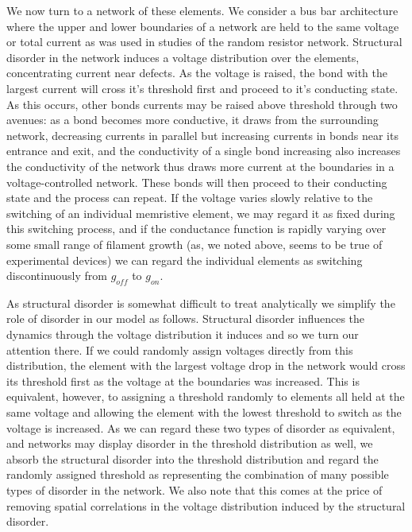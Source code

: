 \documentclass[aps,prl,reprint,groupedaddress]{revtex4-1}
\begin{document}
We now turn to a network of these elements.  We consider a bus bar
architecture
where the upper and lower boundaries of a network are held to the same
voltage or total current as was used in studies of the random resistor network.
Structural disorder in the
network induces a voltage distribution over the elements, concentrating
current near defects. As the voltage is raised, the bond with the largest
current will cross it's threshold first and proceed to it's conducting state.
As this occurs, other bonds currents may be raised above threshold through
two avenues: as a bond becomes more conductive, it draws from the surrounding
network, decreasing currents in parallel but increasing currents in bonds near
its entrance and exit, and the conductivity of a single bond increasing also
increases the conductivity of the network thus draws more current at the
boundaries in a voltage-controlled network. These bonds will then proceed to
their conducting state and the process can repeat.  If the voltage varies
slowly relative to the switching of an individual memristive element, we may
regard it as fixed during this switching process, and if the conductance
function is rapidly varying over some small range of filament growth (as,
we noted above, seems to be true of experimental devices) we can regard the
individual elements as switching discontinuously from
$g_{off}$ to $g_{on}$.

As structural disorder is somewhat difficult to treat analytically we simplify
the role of disorder in our model as follows.  Structural disorder
influences the dynamics through the voltage distribution it induces and so we
turn our attention there.  If we could randomly assign voltages directly
from this distribution, the element with the largest voltage drop in the
network would cross its threshold first as the voltage at the boundaries was
increased.  This is equivalent, however, to
assigning a threshold randomly to elements all held at the same voltage and
allowing the element with the lowest threshold to switch as the voltage is
increased.  As we can regard these two types of disorder as equivalent, and
networks may display disorder in the threshold distribution as well, we absorb
the structural disorder into the threshold distribution and regard the
randomly assigned threshold as representing the combination of many possible
types of disorder in the network.  We also note that this comes at the price
of removing spatial correlations in the voltage distribution induced by the
structural disorder.
\end{document}
